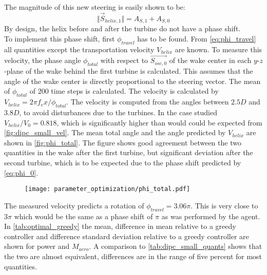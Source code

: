 The magnitude of this new steering is easily shown to be:
\begin{equation}
 \Vert\vec{S}_{helix,1}\Vert =  A_{S,1} + A_{S,0}
\end{equation}
By design, the helix before and after the turbine do not have a phase shift. \\
To implement this phase shift, first $\phi_{travel}$ has to be found. From \eqref{eq:phi_travel} all quantities except the transportation velocity $V_{helix}$ are known. To measure this velocity, the phase angle $\phi_{total}$ with respect to $\vec{S_{osc,0}}$ of the wake center in each $y$-$z$-plane of the wake behind the first turbine is calculated. This assumes that the angle of the wake center is directly proportional to the steering vector. The mean of $\phi_{total}$ of 200 time steps is calculated. The velocity is calculated by $V_{helix} = 2\pi f_e x/\phi_{total}$. The velocity is computed from the angles between $2.5D$ and $3.8D$, to avoid disturbances due to the turbines. In the case studied $V_{helix}/V_0 = 0.818$, which is significantly higher than would could be expected from \autoref{fig:dipc_small_vel}. The mean total angle and the angle predicted by $V_{helix}$ are shown in \autoref{fig:phi_total}. The figure shows good agreement between the two quantities in the wake after the first turbine, but significant deviation after the second turbine, which is to be expected due to the phase shift predicted by \eqref{eq:phi_0}.
\begin{figure}[h]
	\centering
	\texttt{[image: parameter\_optimization/phi\_total.pdf]}
	\caption{}
	\label{fig:phi_total}
\end{figure}
The measured velocity predicts a rotation of $\phi_{travel}=3.06\pi$. This is very close to $3\pi$ which would be the same as a phase shift of $\pi$ as was performed by the agent. In \autoref{tab:optimal_greedy} the mean, difference in mean relative to a greedy controller and difference standard deviation relative to a greedy controller are shown for power and $M_{aero}$. A comparison to \autoref{tab:dipc_small_quants} shows that the two are almost equivalent, differences are in the range of five percent for most quantities.
